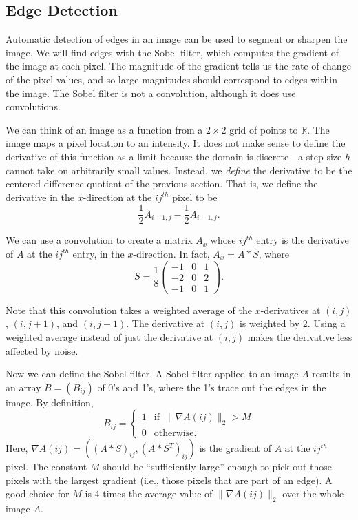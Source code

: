 \subsection*{Edge Detection} %

Automatic detection of edges in an image can be used to segment or sharpen the image.
We will find edges with the Sobel filter, which computes the gradient of the image at each pixel.
The magnitude of the gradient tells us the rate of change of the pixel values, and so large magnitudes should
correspond to edges within the image.
The Sobel filter is not a convolution, although it does use convolutions.

We can think of an image as a function from a $2 \times 2$ grid of points to $\mathbb{R}$.
The image maps a pixel location to an intensity.
It does not make sense to define the derivative of this function as a limit because the domain is discrete---a step size $h$ cannot take on arbitrarily small values.
Instead, we \emph{define} the derivative to be the centered difference quotient of the previous section.
That is, we define the derivative in the $x$-direction at the $ij^{th}$ pixel to be
\[
\frac{1}{2}A_{i+1, j} - \frac{1}{2}A_{i-1, j}.
\]

We can use a convolution to create a matrix $A_x$ whose $ij^{th}$ entry is the derivative of $A$ at the $ij^{th}$ entry, in the $x$-direction.
In fact, $A_x = A \ast S$, where
\[
S = \frac{1}{8} \begin{pmatrix}
-1 & 0 & 1\\
-2 & 0 & 2\\
-1 & 0 & 1
\end{pmatrix}.
\]

Note that this convolution takes a weighted average of the $x$-derivatives at $(i, j)$, $(i, j+1)$, and $(i, j-1)$.
The derivative at $(i, j)$ is weighted by 2.
Using a weighted average instead of just the derivative at $(i, j)$ makes the derivative less affected by noise.

Now we can define the Sobel filter.
A Sobel filter applied to an image $A$ results in an array $B = (B_{ij})$ of 0's and 1's, where the 1's trace out the edges in the image.
By definition,
\[
B_{ij} = \left\{
     \begin{array}{ll}
       1 & \text{if}\; \;\|\nabla A(ij)\|_2 > M \\
       0 & \text{otherwise}.
     \end{array}
   \right.
\]
Here, $\nabla A(ij) = ((A \ast S)_{ij}, (A\ast S^T)_{ij})$ is the gradient of $A$ at the $ij^{th}$ pixel.
The constant $M$ should be ``sufficiently large'' enough to pick out those pixels with the largest gradient (i.e., those pixels that are part of an edge).
A good choice for $M$ is 4 times the average value of $\|\nabla A(ij)\|_2$ over the whole image $A$.

